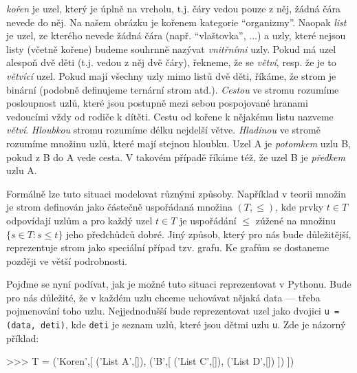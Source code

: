\begin{definition}
\emph{kořen} je uzel, který je úplně na vrcholu, t.j. čáry vedou pouze z něj, žádná čára nevede do něj. Na našem obrázku je kořenem kategorie ``organizmy''.
Naopak \emph{list} je uzel, ze kterého nevede žádná čára (např. ``vlaštovka'', ...) a uzly, které nejsou listy (včetně kořene) budeme souhrnně nazývat
\emph{vnitřními} uzly. Pokud má uzel alespoň dvě děti (t.j. vedou z něj dvě čáry), řekneme, že se \emph{větví}, resp. že je to \emph{větvící} uzel.
Pokud mají všechny uzly mimo listů dvě děti, říkáme, že strom je binární (podobně definujeme ternární strom atd.). \emph{Cestou} ve stromu rozumíme posloupnost uzlů, 
které jsou postupně mezi sebou pospojované hranami vedoucími vždy od rodiče k dítěti. Cestu od kořene k nějakému 
listu nazveme \emph{větví}. \emph{Hloubkou} stromu rozumíme délku nejdelší větve. \emph{Hladinou} ve stromě rozumíme množinu uzlů, které mají stejnou hloubku.
Uzel A je \emph{potomkem} uzlu B, pokud z B do A vede cesta. V takovém případě říkáme též, že uzel B je \emph{předkem} uzlu A. 
\end{definition}

\begin{note}\footnotesize
Formálně lze tuto situaci modelovat různými způsoby. Například v teorii množin je strom definován jako částečně uspořádaná množina $(T,\leq)$,
kde prvky $t\in T$ odpovídají uzlům a pro každý uzel $t\in T$ je uspořádání $\leq$ zúžené na množinu $\{s\in T:s\leq t\}$ jeho předchůdců dobré.
Jiný způsob, který pro nás bude důležitější, reprezentuje strom jako speciální případ tzv. grafu. Ke grafům se dostaneme později ve větší podrobnosti.
\end{note}

Pojďme se nyní podívat, jak je možné tuto situaci reprezentovat v Pythonu. Bude pro nás důležité, že v každém uzlu
chceme uchovávat nějaká data --- třeba pojmenování toho uzlu. Nejjednodušší bude reprezentovat uzel jako dvojici  {\tt u = (data, deti)}, 
kde {\tt deti} je seznam uzlů, které jsou dětmi uzlu {\tt u}. Zde je názorný příklad:

\begin{center}
\begin{minipage}{8cm}
\begin{python}
>>> T = ('Koren',[
	          ('List A',[]),
		  ('B',[
			('List C',[]),
			('List D',[])
			])
		  ])
\end{python}
\end{minipage}
\begin{minipage}{5cm}
\end{minipage}
\end{center}

